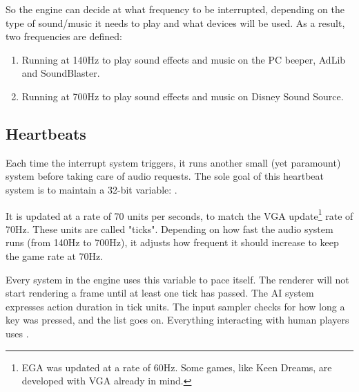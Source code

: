 \documentclass[book.tex]{subfiles}
\begin{document}
\par
So the engine can decide at what frequency to be interrupted, depending on the type of sound/music it needs to play and what devices will be used. As a result, two frequencies are defined: 
\begin{enumerate}
\item Running at 140Hz to play sound effects and music on the PC beeper, AdLib and SoundBlaster.
\item Running at 700Hz to play sound effects and music on Disney Sound Source.
\end{enumerate}
\par
\begin{minipage}{\textwidth}

\end{minipage}
\par












\subsection{Heartbeats}
Each time the interrupt system triggers, it runs another small (yet paramount) system before taking care of audio requests. The sole goal of this heartbeat system is to maintain a 32-bit variable: .\\
\par
\begin{minipage}{\textwidth}

\end{minipage}
\par
It is updated at a rate of 70 units per seconds, to match the VGA update\footnote{EGA was updated at a rate of 60Hz. Some games, like Keen Dreams, are developed with VGA already in mind.} rate of 70Hz. These units are called "ticks". Depending on how fast the audio system runs (from 140Hz to 700Hz), it adjusts how frequent it should increase  to keep the game rate at 70Hz.\\
\par
Every system in the engine uses this variable to pace itself. The renderer will not start rendering a frame until at least one tick has passed. The AI system expresses action duration in tick units. The input sampler checks for how long a key was pressed, and the list goes on. Everything interacting with human players uses .\\
\end{document}
